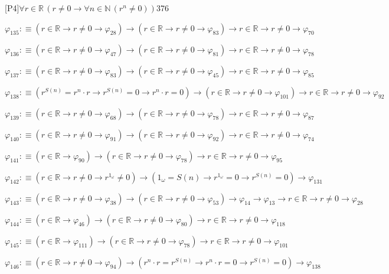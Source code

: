 \begin{fullproof}{[P4]}{$\forall r \in \mathbb{R}\,(r \neq 0 \to \forall n \in \mathbb{N}\,({{r}^{n}} \neq 0))$}{376}
\begin{abbrevlist}
\item $\varphi_{135} :\equiv (r \in \mathbb{R} \to r \neq 0 \to \varphi_{28}) \to (r \in \mathbb{R} \to r \neq 0 \to \varphi_{83}) \to r \in \mathbb{R} \to r \neq 0 \to \varphi_{70}$
\item $\varphi_{136} :\equiv (r \in \mathbb{R} \to r \neq 0 \to \varphi_{47}) \to (r \in \mathbb{R} \to r \neq 0 \to \varphi_{81}) \to r \in \mathbb{R} \to r \neq 0 \to \varphi_{78}$
\item $\varphi_{137} :\equiv (r \in \mathbb{R} \to r \neq 0 \to \varphi_{83}) \to (r \in \mathbb{R} \to r \neq 0 \to \varphi_{45}) \to r \in \mathbb{R} \to r \neq 0 \to \varphi_{85}$
\item $\varphi_{138} :\equiv ({{r}^{S(n)}} = {{r}^{n}} \cdot r \to {{r}^{S(n)}} = 0 \to {{r}^{n}} \cdot r = 0) \to (r \in \mathbb{R} \to r \neq 0 \to \varphi_{101}) \to r \in \mathbb{R} \to r \neq 0 \to \varphi_{92}$
\item $\varphi_{139} :\equiv (r \in \mathbb{R} \to r \neq 0 \to \varphi_{68}) \to (r \in \mathbb{R} \to r \neq 0 \to \varphi_{78}) \to r \in \mathbb{R} \to r \neq 0 \to \varphi_{87}$
\item $\varphi_{140} :\equiv (r \in \mathbb{R} \to r \neq 0 \to \varphi_{91}) \to (r \in \mathbb{R} \to r \neq 0 \to \varphi_{92}) \to r \in \mathbb{R} \to r \neq 0 \to \varphi_{74}$
\item $\varphi_{141} :\equiv (r \in \mathbb{R} \to \varphi_{90}) \to (r \in \mathbb{R} \to r \neq 0 \to \varphi_{78}) \to r \in \mathbb{R} \to r \neq 0 \to \varphi_{95}$
\item $\varphi_{142} :\equiv (r \in \mathbb{R} \to r \neq 0 \to {{r}^{1_{\omega}}} \neq 0) \to (1_{\omega} = S(n) \to {{r}^{1_{\omega}}} = 0 \to {{r}^{S(n)}} = 0) \to \varphi_{131}$
\item $\varphi_{143} :\equiv (r \in \mathbb{R} \to r \neq 0 \to \varphi_{38}) \to (r \in \mathbb{R} \to r \neq 0 \to \varphi_{53}) \to \varphi_{14} \to \varphi_{13} \to r \in \mathbb{R} \to r \neq 0 \to \varphi_{28}$
\item $\varphi_{144} :\equiv (r \in \mathbb{R} \to \varphi_{46}) \to (r \in \mathbb{R} \to r \neq 0 \to \varphi_{80}) \to r \in \mathbb{R} \to r \neq 0 \to \varphi_{118}$
\item $\varphi_{145} :\equiv (r \in \mathbb{R} \to \varphi_{111}) \to (r \in \mathbb{R} \to r \neq 0 \to \varphi_{78}) \to r \in \mathbb{R} \to r \neq 0 \to \varphi_{101}$
\item $\varphi_{146} :\equiv (r \in \mathbb{R} \to r \neq 0 \to \varphi_{94}) \to ({{r}^{n}} \cdot r = {{r}^{S(n)}} \to {{r}^{n}} \cdot r = 0 \to {{r}^{S(n)}} = 0) \to \varphi_{138}$

\end{abbrevlist}
\end{fullproof}
